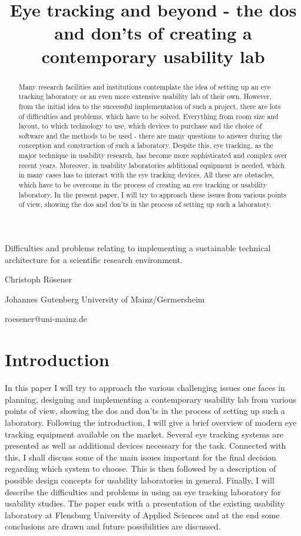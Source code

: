 \title{Eye tracking and beyond - the dos and don'ts of creating a contemporary usability lab}

\begin{styleSubtitle}
Difficulties and problems relating to implementing a sustainable technical architecture for a scientific research environment.
\end{styleSubtitle}

Christoph Rösener

Johannes Gutenberg University of Mainz/Germersheim

roesener@uni-mainz.de

\begin{abstract}
Many research facilities and institutions contemplate the idea of setting up an eye tracking laboratory or an even more extensive usability lab of their own. However, from the initial idea to the successful implementation of such a project, there are lots of difficulties and problems, which have to be solved. Everything from room size and layout, to which technology to use, which devices to purchase and the choice of software and the methods to be used \citep{Dumas1999} - there are many questions to answer during the conception and construction of such a laboratory. Despite this, eye tracking, as the major technique in usability research, has become more sophisticated and complex over recent years. Moreover, in usability laboratories additional equipment is needed, which in many cases has to interact with the eye tracking devices. All these are obstacles, which have to be overcome in the process of creating an eye tracking or usability laboratory. In the present paper, I will try to approach these issues from various points of view, showing the dos and don'ts in the process of setting up such a laboratory.
\end{abstract}

\chapter{Introduction}

In this paper I will try to approach the various challenging issues one faces in planning, designing and implementing a contemporary usability lab from various points of view, showing the dos and don'ts in the process of setting up such a laboratory. Following the introduction, I will give a brief overview of modern eye tracking equipment available on the market. Several eye tracking systems are presented as well as additional devices necessary for the task. Connected with this, I shall discuss some of the main issues important for the final decision regarding which system to choose. This is then followed by a description of possible design concepts for usability laboratories in general. Finally, I will describe the difficulties and problems in using an eye tracking laboratory for usability studies. The paper ends with a presentation of the existing usability laboratory at Flensburg University of Applied Sciences and at the end some conclusions are drawn and future possibilities are discussed.

